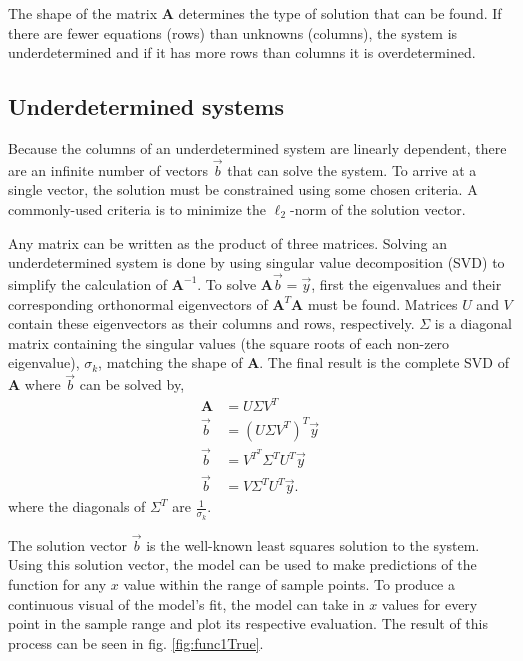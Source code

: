 The shape of the matrix $\mathbf{A}$ determines the type of solution that can be found.  If there are fewer equations (rows) than unknowns (columns), the system is underdetermined and if it has more rows than columns it is overdetermined.  


\subsection{Underdetermined systems}
Because the columns of an underdetermined system are linearly dependent, there are an infinite number of vectors $\vec{b}$ that can solve the system.  To arrive at a single vector, the solution must be constrained using some chosen criteria.  A commonly-used criteria is to minimize the $\ell_2$-norm of the solution vector. 

\par Any matrix can be written as the product of three matrices. Solving an underdetermined system is done by using singular value decomposition (SVD) to simplify the calculation of $\mathbf{A}^{-1}$. To solve $\mathbf{A}\vec{b}=\vec{y}$, first the eigenvalues and their corresponding orthonormal eigenvectors of $\mathbf{A}^T\mathbf{A}$ must be found. Matrices $U$ and $V$ contain these eigenvectors as their columns and rows, respectively. $\Sigma$ is a diagonal matrix containing the singular values (the square roots of each non-zero eigenvalue), $\sigma_k$, matching the shape of $\mathbf{A}$. The final result is the complete SVD of $\mathbf{A}$ where $\vec{b}$ can be solved by,
\begin{align}
\mathbf{A} &= U\Sigma V^T \nonumber \\
\vec{b} &= (U\Sigma V^T)^T\vec{y} \nonumber \\
\vec{b} &= V^{T^T}\Sigma^TU^T\vec{y} \nonumber \\
\vec{b} &= V\Sigma^TU^T\vec{y}.\nonumber 
\end{align}
where the diagonals of $\Sigma^T$ are $\frac{1}{\sigma_k}$.

\par The solution vector $\vec{b}$ is the well-known least squares solution to the system. Using this solution vector, the model can be used to make predictions of the function for any $x$ value within the range of sample points. To produce a continuous visual of the model's fit, the model can take in $x$ values for every point in the sample range and plot its respective evaluation. The result of this process can be seen in fig. \ref{fig:func1True}.


